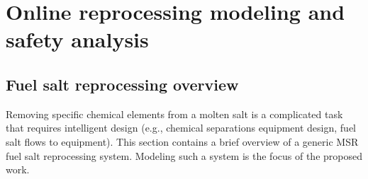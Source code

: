 \chapter[Online reprocessing modeling and safety analysis]{Online reprocessing 
modeling and safety analysis}
\section{Fuel salt reprocessing overview} \label{sec:reproc-plant}
Removing specific chemical elements from a molten salt is a complicated 
task that requires intelligent design (e.g., chemical separations equipment 
design, fuel salt flows to equipment). This section contains a brief overview 
of a generic \gls{MSR} fuel salt reprocessing system. Modeling such a system 
is the focus of the proposed work.

